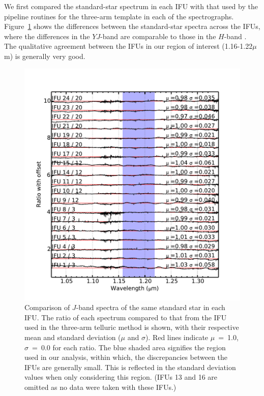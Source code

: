 We first compared the standard-star spectrum in each IFU with that used by the pipeline routines for the three-arm template in each of the spectrographs.
Figure~\ref{fig:IFU_compare} shows the differences between the standard-star spectra across the IFUs,
where the differences in the $YJ$-band are comparable to those in the $H$-band
\cite[cf. Fig.7 from][]{2013A&A...558A..56D}.
The qualitative agreement between the IFUs in our region of interest (1.16-1.22$\mu$m) is generally very good.


\begin{figure}
 \centering
 \begin{center}
 \includegraphics[width=12.0cm]{ngc6822/N6822_t_compare}
 \caption[Comparison of uniformity IFU spectra]{
    Comparison of $J$-band spectra of the same standard star in each IFU.
    The ratio of each spectrum compared to that from the IFU used in the three-arm telluric method is shown,
    with their respective mean and standard deviation ($\mu$ and $\sigma$).
    Red lines indicate $\mu$~=~1.0, $\sigma$~=~0.0 for each ratio.
    The blue shaded area signifies the region used in our analysis,
    within which, the discrepancies between the IFUs are generally small.
    This is reflected in the standard deviation values when only considering this region.
    (IFUs 13 and 16 are omitted as no data were taken with these IFUs.) \label{fig:IFU_compare}
          }
 \end{center}
\end{figure}

